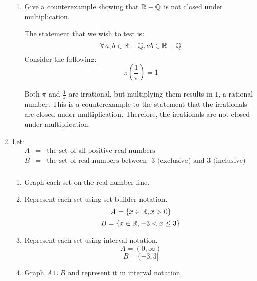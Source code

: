 \documentclass[letterpaper,12pt,fleqn]{article}
\begin{document}
\begin{enumerate}
\begin{enumerate}
  \item Give a counterexample showing that $\mathbb{R}-\mathbb{Q}$ is not closed under
    multiplication.

    The statement that we wish to test is:
    \[\forall\,a,b\in\mathbb{R}-\mathbb{Q},ab\in\mathbb{R}-\mathbb{Q}\]
    Consider the following:
    \[\pi\left(\frac{1}{\pi}\right)=1\]

    Both $\pi$ and $\frac{1}{\pi}$ are irrational, but multiplying them results
    in $1$, a rational number.  This is a counterexample to the statement that
    the irrationals are closed under multiplication. Therefore, the irrationals
    are not closed under multiplication.
  \end{enumerate}
\newpage
\item Let:
\begin{eqnarray*}
A &=& \mbox{the set of all positive real numbers} \\
B &=& \mbox{the set of real numbers between -3 (exclusive) and 3 (inclusive)} \\
\end{eqnarray*}
\begin{enumerate}
\item Graph each set on the real number line.

  \bigskip
  
  
  \bigskip
  
  
\item Represent each set using set-builder notation.
  \[A=\{x\in\mathbb{R},x>0\}\]
  \[B=\{x\in\mathbb{R},-3<x\le3\}\]
  
\item Represent each set using interval notation.
  \[A=(0,\infty)\]
  \[B=(-3,3]\]
    
\item Graph $A\cup B$ and represent it in interval notation.


\end{enumerate}
\end{enumerate}
\end{document}
